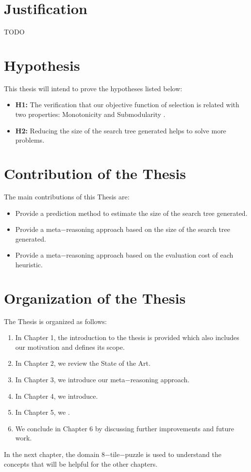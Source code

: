 \section{Justification}
\noindent
TODO

\section{Hypothesis}
\noindent
This thesis will intend to prove the hypotheses listed below:
\begin{itemize}
\item \textbf{H1:} The verification that our objective function of selection is related with two properties: Monotonicity and Submodularity .
\item \textbf{H2:} Reducing the size of the search tree generated helps to solve more problems.
\end{itemize}

\section{Contribution of the Thesis}
\noindent
The main contributions of this Thesis are:
\begin{itemize}
\item Provide a prediction method to estimate the size of the search tree generated.
\item Provide a meta$-$reasoning approach based on the size of the search tree generated.
\item Provide a meta$-$reasoning approach based on the evaluation cost of each heuristic. 
\end{itemize}

\section{Organization of the Thesis}
\noindent
The Thesis is organized as follows: 
\begin{enumerate}
\item In Chapter 1, the introduction to the thesis is provided which also includes our motivation and defines its scope. 
\item In Chapter 2, we review the State of the Art.
\item In Chapter 3, we introduce our meta$-$reasoning approach. 
\item In Chapter 4, we introduce. 
\item In Chapter 5, we .
\item We conclude in Chapter 6 by discussing further improvements and future work.
\end{enumerate}

In the next chapter, the domain 8$-$tile$-$puzzle is used to understand the concepts that will be helpful for the other chapters. \\

\clearpage